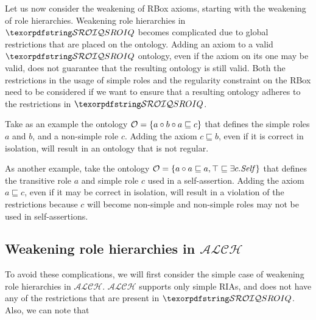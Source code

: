 Let us now consider the weakening of RBox axioms, starting with the weakening of role hierarchies. Weakening role hierarchies in $\SROIQ$ becomes complicated due to global restrictions that are placed on the ontology. Adding an axiom to a valid $\SROIQ$ ontology, even if the axiom on its one may be valid, does not guarantee that the resulting ontology is still valid. Both the restrictions in the usage of simple roles and the regularity constraint on the RBox need to be considered if we want to ensure that a resulting ontology adheres to the restrictions in $\SROIQ$.

\begin{example}
Take as an example the ontology $\mathcal{O} = \{a \circ b \circ a \sqsubseteq c\}$ that defines the simple roles $a$ and $b$, and a non-simple role $c$. Adding the axiom $c \sqsubseteq b$, even if it is correct in isolation, will result in an ontology that is not regular.
\end{example}

\begin{example}
As another example, take the ontology $\mathcal{O} = \{a \circ a \sqsubseteq a, \top \sqsubseteq \exists c . \mathit{Self} \}$ that defines the transitive role $a$ and simple role $c$ used in a self-assertion. Adding the axiom $a \sqsubseteq c$, even if it may be correct in isolation, will result in a violation of the restrictions because $c$ will become non-simple and non-simple roles may not be used in self-assertions.
\end{example}

\subsection{Weakening role hierarchies in $\mathcal{ALCH}$} \label{weakening-role-hierarchies-in-mathcal-alch-}

To avoid these complications, we will first consider the simple case of weakening role hierarchies in $\mathcal{ALCH}$. $\mathcal{ALCH}$ supports only simple RIAs, and does not have any of the restrictions that are present in $\SROIQ$. Also, we can note that

